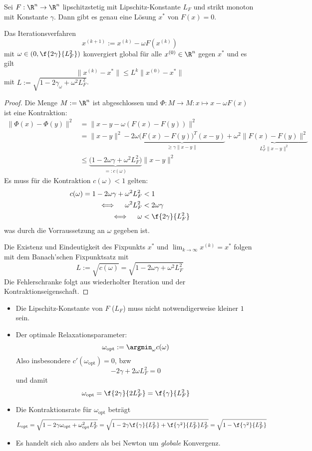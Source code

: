 \documentclass[11pt]{scrartcl}
\begin{document}
\begin{st} \label{3.20}
	Sei $F: \R^n \to \R^n$ lipschitzstetig mit Lipschitz-Konstante $L_F$ und strikt monoton mit Konstante $\gamma$.
	Dann gibt es genau eine Lösung $x^*$ von $F(x) = 0$.
	
	Das Iterationsverfahren
	\[
		x^{(k+1)} := x^{(k)} - \omega F(x^{(k)})
	\]
	mit $\omega \in (0, \f {2\gamma}{L_F^2})$ konvergiert global für alle $x^{(0)} \in \R^n$ gegen $x^*$ und es gilt
	\[
		\|x^{(k)} - x^*\| \le L^k \|x^{(0)} - x^*\|
	\]
	mit $L := \sqrt{1- 2 \gamma_\omega + \omega^2 L_F^2}$.
	\begin{proof}
		Die Menge $M := \R^n$ ist abgeschlossen und $\Phi: M \to M : x \mapsto x - \omega F(x)$ ist eine Kontraktion:
		\begin{align*}
			\|\Phi(x) - \Phi(y) \|^2 
			&= \|x-y - \omega(F(x) - F(y)) \|^2 \\
			&= \|x-y\|^2 - 2 \omega \underbrace{\big(F(x)-F(y)\big)^T(x-y)}_{\ge \gamma \|x-y\|} + \omega^2 \underbrace{\|F(x)-F(y)\|^2}_{L_F^2 \|x-y\|^2} \\
			&\le \underbrace{\big(1-2\omega \gamma + \omega^2 L_F^2\big)}_{=:c(\omega)} \|x-y\|^2
		\end{align*}
		Es muss für die Kontraktion $c(\omega) < 1$ gelten:
		\begin{align*}
			c(\omega) = 1 - 2 \omega \gamma + \omega^2 L_F^2 &< 1 \\
			\iff \quad \omega^2 L_F^2 &< 2 \omega \gamma \\
			\iff \quad  \omega &< \f {2\gamma}{L_F^2}
		\end{align*}
		was durch die Vorraussetzung an $\omega$ gegeben ist.

		Die Existenz und Eindeutigkeit des Fixpunkts $x^*$ und $\lim_{k\to \infty}x^{(k)} = x^*$ folgen mit dem Banach'schen Fixpunktsatz mit
		\[
			L := \sqrt{c(\omega)} = \sqrt{1-2\omega \gamma + \omega^2 L_F^2}
		\]
		Die Fehlerschranke folgt aus wiederholter Iteration und der Kontraktionseigenschaft.
	\end{proof}
	\begin{note}
		\begin{itemize}
			\item
				Die Lipschitz-Konstante von $F$ ($L_F$) muss nicht notwendigerweise kleiner $1$ sein.
			\item
				Der optimale Relaxationsparameter:
				\[
					\omega_{\text{opt}} := \argmin_{\omega} c(\omega)
				\]
				Also insbesondere $c'(\omega_{\text{opt}}) = 0$, bzw
				\[
					- 2 \gamma + 2 \omega L_F^2 = 0
				\]
				und damit
				\[
					\omega_{\text{opt}} = \f {2 \gamma}{2L_F^2} = \f {\gamma}{L_F^2}
				\]
			\item
				Die Kontraktionsrate für $\omega_{\text{opt}}$ beträgt
				\[
					L_{\text{opt}} = \sqrt{1-2 \gamma \omega_{\text{opt}} + \omega_{\text{opt}}^2 L_F^2}
					= \sqrt{1-2 \gamma \f{\gamma}{L_F^2} + \f{\gamma^2}{L_F^2} L_F^2} 
					= \sqrt {1 - \f {\gamma^2}{L_F^2}}
				\]
			\item
				Es handelt sich also anders als bei Newton um \emph{globale} Konvergenz.


\end{itemize}
\end{note}
\end{st}
\end{document}
